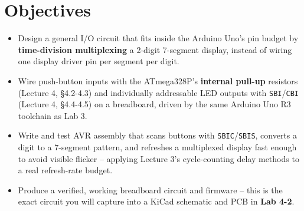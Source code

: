 \documentclass[11pt]{article}
\begin{document}
\labheader

\section*{Objectives}
\begin{itemize}[leftmargin=*,nosep]
  \item Design a general I/O circuit that fits inside the Arduino Uno's pin budget by
        \textbf{time-division multiplexing} a 2-digit 7-segment display, instead of
        wiring one display driver pin per segment per digit.
  \item Wire push-button inputs with the ATmega328P's \textbf{internal pull-up}
        resistors (Lecture 4, \S4.2-4.3) and individually addressable LED outputs
        with \texttt{SBI}/\texttt{CBI} (Lecture 4, \S4.4-4.5) on a breadboard, driven
        by the same Arduino Uno R3 toolchain as Lab 3.
  \item Write and test AVR assembly that scans buttons with \texttt{SBIC}/\texttt{SBIS},
        converts a digit to a 7-segment pattern, and refreshes a multiplexed display
        fast enough to avoid visible flicker -- applying Lecture 3's cycle-counting
        delay methods to a real refresh-rate budget.
  \item Produce a verified, working breadboard circuit and firmware -- this is the
        exact circuit you will capture into a KiCad schematic and PCB in
        \textbf{Lab 4-2}.
\end{itemize}
\end{document}
